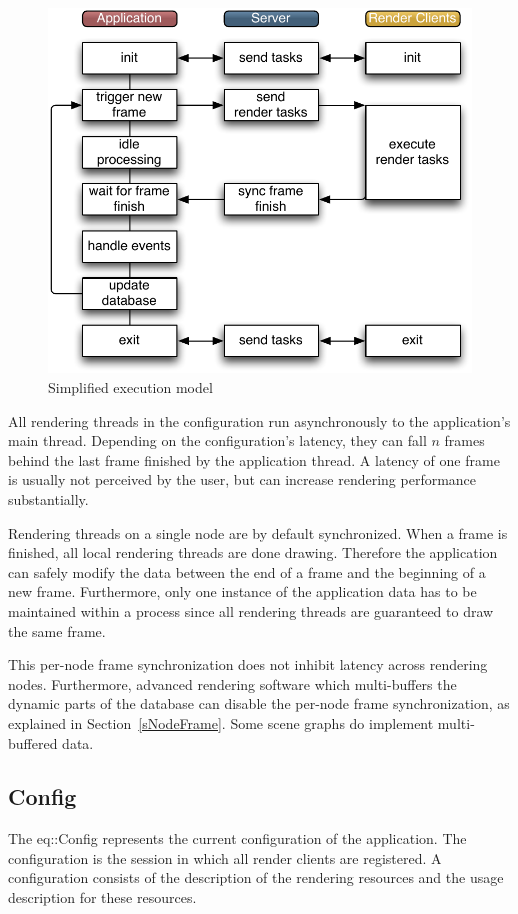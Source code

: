 \documentclass[10pt,a4]{scrartcl}
\newcommand{\sref}[1]{Section~\ref{#1}}
\begin{document}
\begin{figure}
  \includegraphics[width=.618\textwidth]{images/model.pdf}
  {\caption{\small\label{fModel}Simplified execution model}}
\end{figure}
All rendering threads in the configuration run asynchronously to the
application's main thread. Depending on the configuration's latency,
they can fall $n$ frames behind the last frame finished by the
application thread. A latency of one frame is usually not perceived by
the user, but can increase rendering performance substantially.

Rendering threads on a single node are by default synchronized. When a
frame is finished, all local rendering threads are done
drawing. Therefore the application can safely modify the data between
the end of a frame and the beginning of a new frame. Furthermore, only
one instance of the application data has to be maintained within a
process since all rendering threads are guaranteed to draw the same frame.

This per-node frame synchronization does not inhibit latency across
rendering nodes. Furthermore, advanced rendering software which
multi-buffers the dynamic parts of the database can disable the per-node
frame synchronization, as explained in \sref{sNodeFrame}. Some scene
graphs do implement multi-buffered data.



\subsection{\label{sConfig}Config}

The \textsf{eq::Config} represents the current configuration of the
application. The configuration is the session in which all render
clients are registered. A configuration consists of the description of
the rendering resources and the usage description for these resources.
\end{document}
